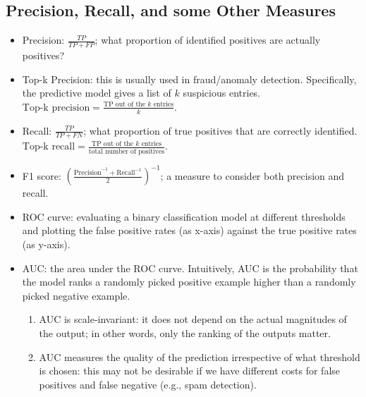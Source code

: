 \subsection{Precision, Recall, and some Other Measures}
    \begin{itemize}
        \item Precision: $\frac{TP}{TP + FP}$; what proportion of identified positives are actually positives?
        \item Top-k Precision: this is usually used in fraud/anomaly detection. Specifically, the predictive model gives a list of $k$ suspicious entries.
        $\text{Top-k precision} = \frac{\text{TP out of the $k$ entries}}{k}$.
        \item Recall: $\frac{TP}{TP + FN}$; what proportion of true positives that are correctly identified. $\text{Top-k recall} = \frac{\text{TP out of the $k$ entries}}{\text{total number of positives}}$.
        \item F1 score: $\left( \frac{\text{Precision}^{-1} + \text{Recall}^{-1}}{2} \right)^{-1}$; a measure to consider both precision and recall.
        \item ROC curve: evaluating a binary classification model at different thresholds and plotting the false positive rates (as x-axis) against the true positive rates (as y-axis).
        \item AUC: the area under the ROC curve. Intuitively, AUC is the probability that the model ranks a randomly picked positive example higher than a randomly picked negative example.
            \begin{enumerate}
                \item AUC is scale-invariant: it does not depend on the actual magnitudes of the output; in other words, only the ranking of the outputs matter.
                \item AUC measures the quality of the prediction irrespective of what threshold is chosen: this may not be desirable if we have different costs for false positives and false negative (e.g., spam detection).
            \end{enumerate}
    \end{itemize}
    



